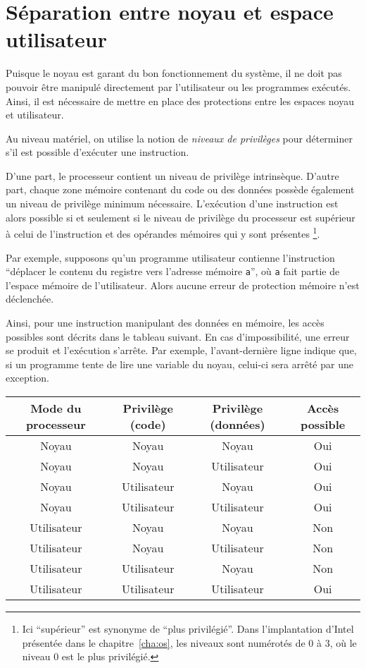 \section{Séparation entre noyau et espace utilisateur}

Puisque le noyau est garant du bon fonctionnement du système, il ne doit pas
pouvoir être manipulé directement par l'utilisateur ou les programmes exécutés.
Ainsi, il est nécessaire de mettre en place des protections entre les espaces
noyau et utilisateur.

Au niveau matériel, on utilise la notion de \emph{niveaux de privilèges} pour
déterminer s'il est possible d'exécuter une instruction.

D'une part, le processeur contient un niveau de privilège intrinsèque. D'autre
part, \linebreak chaque zone mémoire contenant du code ou des données possède
également un niveau de privilège minimum nécessaire. L'exécution d'une
instruction est alors possible si et seulement si le niveau de privilège du
processeur est supérieur à celui de l'instruction et des opérandes mémoires qui
y sont présentes
\footnote{
  Ici \enquote{supérieur} est synonyme de \enquote{plus privilégié}. Dans l'implantation
  d'Intel présentée dans le chapitre~\ref{cha:os}, les niveaux sont numérotés de
  0 à 3, où le niveau 0 est le plus privilégié.
}.

Par exemple, supposons qu'un programme utilisateur contienne l'instruction
\enquote{déplacer le contenu du registre \eax{} vers l'adresse mémoire
\texttt{a}}, où \texttt{a} fait partie de l'espace mémoire de l'utilisateur.
Alors aucune erreur de protection mémoire n'est déclenchée.

Ainsi, pour une instruction manipulant des données en mémoire, les accès
possibles sont décrits dans le tableau suivant. En cas d'impossibilité, une
erreur se produit et l'exécution s'arrête. Par exemple, l'avant-dernière ligne
indique que, si un programme tente de lire une variable du noyau, celui-ci sera
arrêté par une exception.

\begin{center}
\def\modeK{Noyau\xspace}
\def\modeU{Utilisateur\xspace}
\begin{tabular}{cccc}
\toprule
  Mode du processeur
& Privilège (code)
& Privilège (données)
& Accès possible \\
\midrule
  \modeK{} & \modeK{} & \modeK{} & Oui \\
  \modeK{} & \modeK{} & \modeU{} & Oui \\
  \modeK{} & \modeU{} & \modeK{} & Oui \\
  \modeK{} & \modeU{} & \modeU{} & Oui \\
  \modeU{} & \modeK{} & \modeK{} & Non \\
  \modeU{} & \modeK{} & \modeU{} & Non \\
  \modeU{} & \modeU{} & \modeK{} & Non \\
  \modeU{} & \modeU{} & \modeU{} & Oui \\
\bottomrule
\end{tabular}
\end{center}
\label{page:erreursec}

